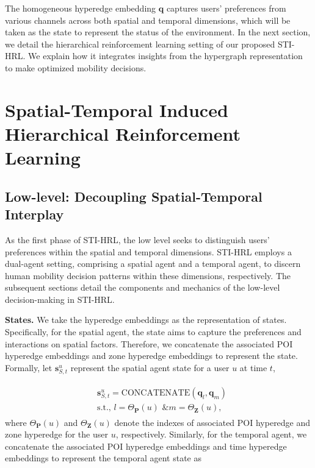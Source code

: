 \documentclass[letterpaper]{article} %
\begin{document}
The homogeneous hyperedge embedding $\mathbf{q}$ captures users' preferences from various channels across both spatial and temporal dimensions, which will be taken as the state to represent the status of the environment.
In the next section, we detail the hierarchical reinforcement learning setting of our proposed STI-HRL. 
We explain how it integrates insights from the hypergraph representation to make optimized mobility decisions. 

\section{Spatial-Temporal Induced Hierarchical Reinforcement Learning}

\subsection{Low-level: Decoupling Spatial-Temporal Interplay}
As the first phase of STI-HRL, the low level seeks to distinguish users' preferences within the spatial and temporal dimensions. 
STI-HRL employs a dual-agent setting, comprising a spatial agent and a temporal agent, to discern human mobility decision patterns within these dimensions, respectively. The subsequent sections detail the components and mechanics of the low-level decision-making in STI-HRL.


\noindent\textbf{States.} 
We take the hyperedge embeddings as the representation of states. 
Specifically, for the spatial agent, the state aims to capture the preferences and interactions on spatial factors. 
Therefore, we concatenate the associated POI hyperedge embeddings and zone hyperedge embeddings to represent the state. Formally, let $\mathbf{s}^{u}_{S,t}$ represent the spatial agent state for a user $u$ at time $t$, 


\begin{align}
\begin{split}
    &\mathbf{s}^{u}_{S,t} = \text{CONCATENATE} (\mathbf{q}_l, \mathbf{q}_m) \\
    &\text{s.t., }l=\Theta_{\mathbf{P}}(u) \text{ \& }
 m=\Theta_{\mathbf{Z}}(u), 
 \end{split}
\end{align}
where $\Theta_{\mathbf{P}}(u)$ and $\Theta_{\mathbf{Z}}(u)$ denote the indexes of associated POI hyperedge and zone hyperedge for the user $u$, respectively. 
Similarly, for the temporal agent, we concatenate the associated POI hyperedge embeddings and time hyperedge embeddings to represent the temporal agent state as 
\end{document}
